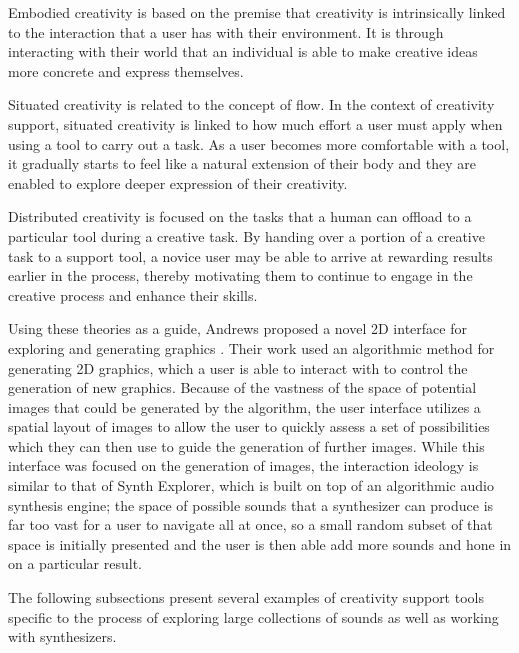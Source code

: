 Embodied creativity is based on the premise that creativity is intrinsically linked to the interaction that a user has with their environment. It is through interacting with their world that an individual is able to make creative ideas more concrete and express themselves.

Situated creativity is related to the concept of flow. In the context of creativity support, situated creativity is linked to how much effort a user must apply when using a tool to carry out a task. As a user becomes more comfortable with a tool, it gradually starts to feel like a natural extension of their body and they are enabled to explore deeper expression of their creativity.

Distributed creativity is focused on the tasks that a human can offload to a particular tool during a creative task. By handing over a portion of a creative task to a support tool, a novice user may be able to arrive at rewarding results earlier in the process, thereby motivating them to continue to engage in the creative process and enhance their skills.

Using these theories as a guide, Andrews proposed a novel 2D interface for exploring and generating graphics \cite{10.1145/3325480.3325506}. Their work used an algorithmic method for generating 2D graphics, which a user is able to interact with to control the generation of new graphics. Because of the vastness of the space of potential images that could be generated by the algorithm, the user interface utilizes a spatial layout of images to allow the user to quickly assess a set of possibilities which they can then use to guide the generation of further images. While this interface was focused on the generation of images, the interaction ideology is similar to that of Synth Explorer, which is built on top of an algorithmic audio synthesis engine; the space of possible sounds that a synthesizer can produce is far too vast for a user to navigate all at once, so a small random subset of that space is initially presented and the user is then able add more sounds and hone in on a particular result.

The following subsections present several examples of creativity support tools specific to the process of exploring large collections of sounds as well as working with synthesizers.

